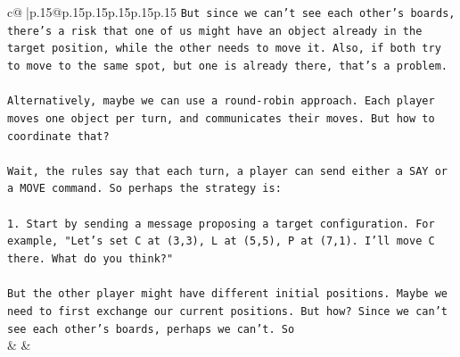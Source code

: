 \documentclass{article}
\begin{document}
{\begin{supertabular}{c@{$\;$}|p{.15\linewidth}@{}p{.15\linewidth}p{.15\linewidth}p{.15\linewidth}p{.15\linewidth}p{.15\linewidth}}
{{{\texttt{But since we can't see each other's boards, there's a risk that one of us might have an object already in the target position, while the other needs to move it. Also, if both try to move to the same spot, but one is already there, that's a problem.} \\
\\ 
\texttt{Alternatively, maybe we can use a round{-}robin approach. Each player moves one object per turn, and communicates their moves. But how to coordinate that?} \\
\\ 
\texttt{Wait, the rules say that each turn, a player can send either a SAY or a MOVE command. So perhaps the strategy is:} \\
\\ 
\texttt{1. Start by sending a message proposing a target configuration. For example, "Let's set C at (3,3), L at (5,5), P at (7,1). I'll move C there. What do you think?"} \\
\\ 
\texttt{But the other player might have different initial positions. Maybe we need to first exchange our current positions. But how? Since we can't see each other's boards, perhaps we can't. So} \\
            }
        }
    }
    & & \\ \\


\end{supertabular}}
\end{document}
